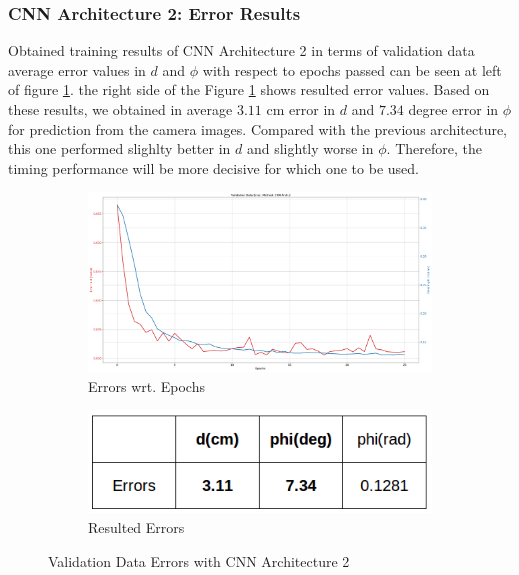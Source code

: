 \documentclass[11pt,letterpaper]{article}
\begin{document}
	\subsubsection{CNN Architecture 2: Error Results}
	Obtained training results of CNN Architecture 2 in terms of validation data average error values in $d$ and $\phi$ with respect to epochs passed can be seen at left of figure \ref{fig:09}. the right side of the Figure \ref{fig:09} shows resulted error values. Based on these results, we obtained in average $3.11$ cm error in $d$ and $7.34$ degree error in $\phi$ for prediction from the camera images. Compared with the previous architecture, this one performed slighlty better in $d$ and slightly worse in $\phi$. Therefore, the timing performance will be more decisive for which one to be used.  
	
	\begin{figure}[h!]
		\centering
		\begin{subfigure}[b]{0.74\linewidth}
			\includegraphics[width=\linewidth]{err-arc2.png}
			\caption{Errors wrt. Epochs}
		\end{subfigure}
		\begin{subfigure}[b]{0.24\linewidth}
			\includegraphics[width=\linewidth]{err-arc2-table.png}
			\caption{Resulted Errors}
		\end{subfigure}
		\caption{Validation Data Errors with CNN Architecture 2}
		\label{fig:09}
	\end{figure}  
	
\end{document}
